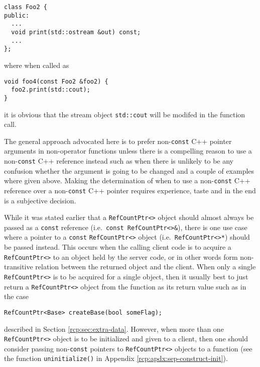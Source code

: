 {\scriptsize\begin{verbatim}
class Foo2 {
public:
  ...
  void print(std::ostream &out) const;
  ...
};
\end{verbatim}}

{}\noindent{}where when called as

{\scriptsize\begin{verbatim}
void foo4(const Foo2 &foo2) {
  foo2.print(std::cout);
}
\end{verbatim}}

{}\noindent{}it is obvious that the stream object {}\texttt{std::cout}
will be modifed in the function call.

The general approach advocated here is to prefer non-\texttt{const}
C++ pointer arguments in non-operator functions unless there is a
compelling reason to use a non-\texttt{const} C++ reference instead
such as when there is unlikely to be any confusion whether the
argument is going to be changed and a couple of examples where given
above.  Making the determination of when to use a non-\texttt{const}
C++ reference over a non-\texttt{const} C++ pointer requires
experience, taste and in the end is a subjective decision.

While it was stated earlier that a {}\texttt{Ref\-Count\-Ptr<>} object
should almost always be passed as a {}\texttt{const} reference
(i.e.~{}\texttt{const Ref\-Count\-Ptr<>\&}), there is one use case
where a pointer to a {}\texttt{const} {}\texttt{Ref\-Count\-Ptr<>}
object (i.e.~{}\texttt{Ref\-Count\-Ptr<>*}) should be passed instead.
This occurs when the calling client code is to acquire a
{}\texttt{Ref\-Count\-Ptr<>} to an object held by the server code, or
in other words form non-transitive relation between the returned
object and the client.  When only a single
{}\texttt{Ref\-Count\-Ptr<>} is to be acquired for a single object,
then it usually best to just return a {}\texttt{Ref\-Count\-Ptr<>}
object from the function as its return value such as in the case

{\scriptsize\begin{verbatim}
RefCountPtr<Base> createBase(bool someFlag);
\end{verbatim}}

{}\noindent{}described in Section {}\ref{rcp:sec:extra-data}.
However, when more than one {}\texttt{Ref\-Count\-Ptr<>} object is to
be initialized and given to a client, then one should consider passing
non-{}\texttt{const} pointers to {}\texttt{Ref\-Count\-Ptr<>} objects
to a function (see the function {}\texttt{uninitialize()} in Appendix
{}\ref{rcp:apdx:sep-construct-init}).


